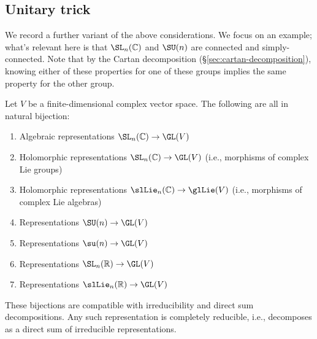 \documentclass[reqno]{amsart} 
\begin{document}
\subsection{Unitary trick}
We record a further variant of the above considerations.  We focus on an example; what's relevant here is that $\SL_n(\mathbb{C})$ and $\SU(n)$ are connected and simply-connected.  Note that by the Cartan decomposition (\S\ref{sec:cartan-decomposition}), knowing either of these properties for one of these groups implies the same property for the other group.
\begin{theorem}\label{thm:unitary-trick}
  Let $V$ be a finite-dimensional complex vector space.  The following are all in natural bijection:
  \begin{enumerate}
  \item Algebraic representations $\SL_n(\mathbb{C}) \rightarrow \GL(V)$
  \item Holomorphic representations $\SL_n(\mathbb{C}) \rightarrow \GL(V)$ (i.e., morphisms of complex Lie groups)
  \item Holomorphic representations $\slLie_n(\mathbb{C}) \rightarrow \glLie(V)$ (i.e., morphisms of complex Lie algebras)
  \item Representations $\SU(n) \rightarrow \GL(V)$
  \item Representations $\su(n) \rightarrow \GL(V)$
  \item Representations $\SL_n(\mathbb{R}) \rightarrow \GL(V)$
  \item Representations $\slLie_n(\mathbb{R}) \rightarrow \GL(V)$
  \end{enumerate}
  These bijections are compatible with irreducibility and direct sum decompositions.  Any such representation is completely reducible, i.e., decomposes as a direct sum of irreducible representations.
\end{theorem}
\end{document}
